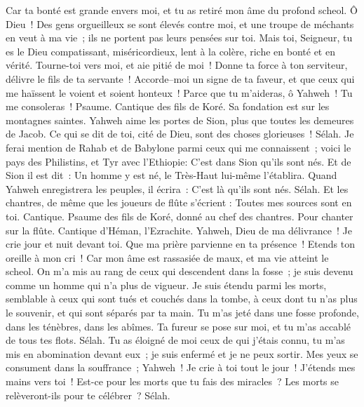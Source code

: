 \begin{multicols}{2}
Car ta bonté est grande envers moi, et tu as retiré mon âme du profond scheol.
Ô Dieu~! Des gens orgueilleux se sont élevés contre moi, et une troupe de méchants en veut à ma vie~; ils ne portent pas leurs pensées sur toi.
Mais toi, Seigneur, tu es le Dieu compatissant, miséricordieux, lent à la colère, riche en bonté et en vérité.
Tourne-toi vers moi, et aie pitié de moi~! Donne ta force à ton serviteur, délivre le fils de ta servante~!
Accorde–moi un signe de ta faveur, et que ceux qui me haïssent le voient et soient honteux~! Parce que tu m'aideras, ô Yahweh~! Tu me consoleras~!
\VerseOne{}Psaume. Cantique des fils de Koré. Sa fondation est sur les montagnes saintes.
Yahweh aime les portes de Sion, plus que toutes les demeures de Jacob.
Ce qui se dit de toi, cité de Dieu, sont des choses glorieuses~! Sélah.
Je ferai mention de Rahab et de Babylone parmi ceux qui me connaissent~; voici le pays des Philistins, et Tyr avec l'Ethiopie: C'est dans Sion qu'ils sont nés.
Et de Sion il est dit~: Un homme y est né, le Très-Haut lui-même l'établira.
Quand Yahweh enregistrera les peuples, il écrira~: C'est là qu'ils sont nés. Sélah.
Et les chantres, de même que les joueurs de flûte s'écrient : Toutes mes sources sont en toi.
\VerseOne{}Cantique. Psaume des fils de Koré, donné au chef des chantres. Pour chanter sur la flûte. Cantique d'Héman, l'Ezrachite.
Yahweh, Dieu de ma délivrance~! Je crie jour et nuit devant toi.
Que ma prière parvienne en ta présence~! Etends ton oreille à mon cri~!
Car mon âme est rassasiée de maux, et ma vie atteint le scheol.
On m'a mis au rang de ceux qui descendent dans la fosse~; je suis devenu comme un homme qui n'a plus de vigueur.
Je suis étendu parmi les morts, semblable à ceux qui sont tués et couchés dans la tombe, à ceux dont tu n'as plus le souvenir, et qui sont séparés par ta main.
Tu m'as jeté dans une fosse profonde, dans les ténèbres, dans les abîmes.
Ta fureur se pose sur moi, et tu m'as accablé de tous tes flots. Sélah.
Tu as éloigné de moi ceux de qui j'étais connu, tu m'as mis en abomination devant eux~; je suis enfermé et je ne peux sortir.
Mes yeux se consument dans la souffrance~; Yahweh~! Je crie à toi tout le jour~! J'étends mes mains vers toi~!
Est-ce pour les morts que tu fais des miracles~? Les morts se relèveront-ils pour te célébrer~? Sélah.

\end{multicols}
